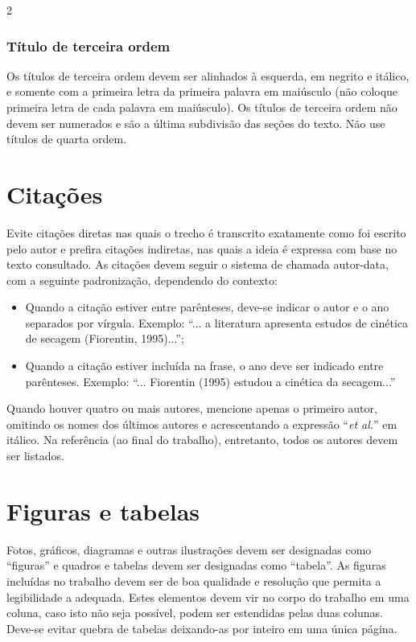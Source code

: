 \documentclass[a4paper,12pt,fleqn]{article}
\begin{document}
\begin{multicols}{2}
		\subsubsection{Título de terceira ordem}
		Os títulos de terceira ordem devem ser alinhados à esquerda, em negrito e itálico, e somente com a primeira letra da primeira palavra em maiúsculo (não coloque primeira letra de cada palavra em maiúsculo). Os títulos de terceira ordem não devem ser numerados e são a última subdivisão das seções do texto. Não use títulos de quarta ordem.

		\section{Citações}
		Evite citações diretas nas quais o trecho é transcrito exatamente como foi escrito pelo autor e prefira citações indiretas, nas quais a ideia é expressa com base no texto consultado. As citações devem seguir o sistema de chamada autor-data, com a seguinte padronização, dependendo do contexto:

		\begin{itemize}
			\item Quando a citação estiver entre parênteses, deve-se indicar o autor e o ano separados por vírgula. Exemplo: “... a literatura apresenta estudos de cinética de secagem (Fiorentin, 1995)...”;
			\item Quando a citação estiver incluída na frase, o ano deve ser indicado entre parênteses. Exemplo: “... Fiorentin (1995) estudou a cinética da secagem...” 
		\end{itemize}

		Quando houver quatro ou mais autores, mencione apenas o primeiro autor, omitindo os nomes dos últimos autores e acrescentando a expressão “\textit{et al.}” em itálico. Na referência (ao final do trabalho), entretanto, todos os autores devem ser listados.

		\section{Figuras e tabelas}
		Fotos, gráficos, diagramas e outras ilustrações devem ser designadas como “figuras” e quadros e tabelas devem ser designadas como “tabela”. As figuras incluídas no trabalho devem ser de boa qualidade e resolução que permita a legibilidade a adequada. Estes elementos devem vir no corpo do trabalho em uma coluna, caso isto não seja possível, podem ser estendidas pelas duas colunas. Deve-se evitar quebra de tabelas deixando-as por inteiro em uma única página.


\end{multicols}
\end{document}
